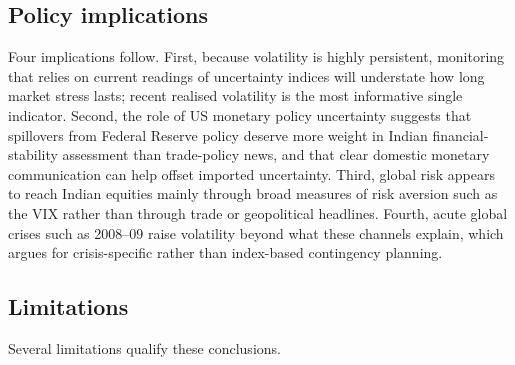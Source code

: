 \documentclass[10pt,twocolumn,a4paper]{article}
\begin{document}
\subsection{Policy implications}

Four implications follow. First, because volatility is highly persistent, monitoring that relies on current readings of uncertainty indices will understate how long market stress lasts; recent realised volatility is the most informative single indicator. Second, the role of US monetary policy uncertainty suggests that spillovers from Federal Reserve policy deserve more weight in Indian financial-stability assessment than trade-policy news, and that clear domestic monetary communication can help offset imported uncertainty. Third, global risk appears to reach Indian equities mainly through broad measures of risk aversion such as the VIX rather than through trade or geopolitical headlines. Fourth, acute global crises such as 2008--09 raise volatility beyond what these channels explain, which argues for crisis-specific rather than index-based contingency planning.

\subsection{Limitations}

Several limitations qualify these conclusions.
\end{document}
